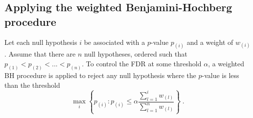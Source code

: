 \documentclass{article}
\begin{document}
%
% 

\subsection{Applying the weighted Benjamini-Hochberg procedure}
Let each null hypothesis $i$ be associated with a $p$-value $p_{(i)}$ and a weight of $w_{(i)}$.
Assume that there are $n$ null hypotheses, ordered such that $p_{(1)} < p_{(2)} < ... < p_{(n)}$.
To control the FDR at some threshold $\alpha$, a weighted BH procedure is applied \cite{benjamini1997multiple} to reject any null hypothesis where the $p$-value is less than the threshold
\[
    \max_i \left\{ p_{(i)} : p_{(i)} \le \alpha \frac{\sum_{l=1}^{i} w_{(l)}}{\sum_{l=1}^{n} w_{(l)}} \right\}  \;.
\]
\end{document}
